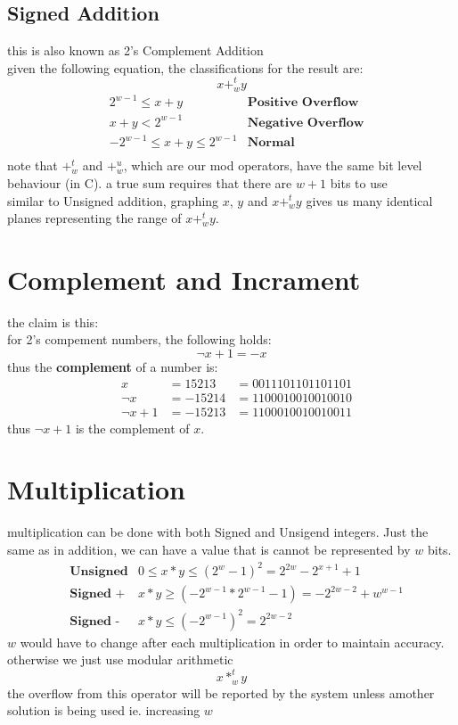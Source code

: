 \documentclass[12pt]{book}
\begin{document}
\pagebreak 


\subsection*{Signed Addition}
this is also known as 2's Complement Addition\\
given the following equation, the classifications for the result are:
\[x+^{t}_{w}y\]
\begin{align*}
        &2^{w-1} \leq x+y &\textbf{Positive Overflow}\\
        &x+y < 2^{w-1} &\textbf{Negative Overflow}\\
        &-2^{w-1} \leq x+y \leq 2^{w-1} &\textbf{Normal}\\
\end{align*}
note that $+^{t}_{w}$ and $+^{u}_{w}$, which are our mod operators, have the same bit level behaviour (in C).
a true sum requires that there are $w+1$ bits to use\\
similar to Unsigned addition, graphing $x$, $y$ and $x+^{t}_{w}y$ gives us many identical planes representing the range of 
$x+^{t}_{w}y$.

\section*{Complement and Incrament}
the claim is this:\\
for 2's compement numbers, the following holds:
\[\neg x+1 = -x\]
thus the \textbf{complement} of a number is:
\begin{align*}
        &x&=15213        &=00111011 01101101\\
        &\neg x&=-15214  &=11000100 10010010\\
        &\neg x+1&=-15213&=11000100 10010011
\end{align*}
thus $\neg x+1$ is the complement of $x$.

\pagebreak


\section*{Multiplication}
multiplication can be done with both Signed and Unsigend integers. 
Just the same as in addition, we can have a value that is cannot be represented by $w$ bits.
\begin{align*}
        &\textbf{Unsigned}      &0 \leq x*y\leq (2^w -1)^2 = 2^{2w} - 2^{x+1}+1\\
        &\textbf{Signed +}      &x*y \geq (-2^{w-1}*2^{w-1}-1) = -2^{2w-2}+w^{w-1}\\
        &\textbf{Signed -}      &x*y\leq (-2^{w-1})^2 = 2^{2w-2}
\end{align*}
$w$ would have to change after each multiplication in order to maintain accuracy. otherwise we just use modular arithmetic
\[x*^{t}_{w}y\]
the overflow from this operator will be reported by the system unless amother solution is being used ie. increasing $w$
\end{document}
